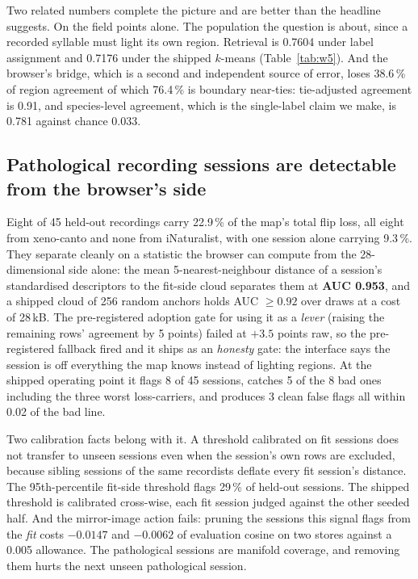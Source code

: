 \documentclass[10pt,twocolumn,a4paper]{article}
\begin{document}
Two related numbers complete the picture and are better than the headline suggests. On the
field points alone. The population the question is about, since a recorded syllable must
light its own region. Retrieval is 0.7604 under label assignment and 0.7176 under the
shipped $k$-means (Table~\ref{tab:w5}). And the browser's bridge, which is a second and
independent source of error, loses 38.6\,\% of region agreement of which 76.4\,\% is boundary
near-ties: tie-adjusted agreement is 0.91, and species-level agreement, which is the
single-label claim we make, is 0.781 against chance 0.033.

\subsection{Pathological recording sessions are detectable from the browser's side}

Eight of 45 held-out recordings carry 22.9\,\% of the map's total flip loss, all eight from
xeno-canto and none from iNaturalist, with one session alone carrying 9.3\,\%. They separate
cleanly on a statistic the browser can compute from the 28-dimensional side alone: the mean
5-nearest-neighbour distance of a session's standardised descriptors to the fit-side cloud
separates them at \textbf{AUC 0.953}, and a shipped cloud of 256 random anchors holds
AUC $\ge 0.92$ over draws at a cost of 28\,kB. The pre-registered adoption gate for using it
as a \emph{lever} (raising the remaining rows' agreement by 5 points) failed at $+3.5$
points raw, so the pre-registered fallback fired and it ships as an \emph{honesty} gate: the
interface says the session is off everything the map knows instead of lighting regions. At
the shipped operating point it flags 8 of 45 sessions, catches 5 of the 8 bad ones including
the three worst loss-carriers, and produces 3 clean false flags all within 0.02 of the bad
line.

Two calibration facts belong with it. A threshold calibrated on fit sessions does not
transfer to unseen sessions even when the session's own rows are excluded, because sibling
sessions of the same recordists deflate every fit session's distance. The 95th-percentile
fit-side threshold flags 29\,\% of held-out sessions. The shipped threshold is calibrated
cross-wise, each fit session judged against the other seeded half. And the mirror-image
action fails: pruning the sessions this signal flags from the \emph{fit} costs $-0.0147$ and
$-0.0062$ of evaluation cosine on two stores against a 0.005 allowance. The pathological
sessions are manifold coverage, and removing them hurts the next unseen pathological session.
\end{document}
